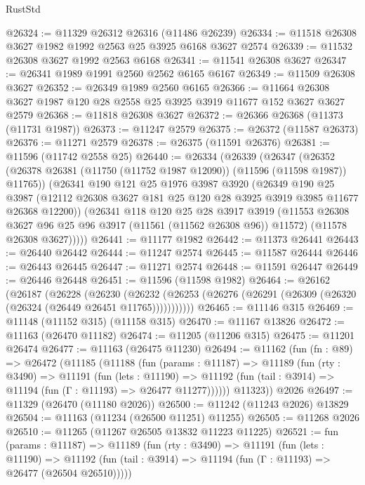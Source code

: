 \begin{lexlean}{RustStd}
\begin{coremodule}
@26324 := @11329 @26312 @26316 (@11486 @26239)
@26334 := @11518 @26308 @3627 @1982 @1992 @2563 @25 @3925 @6168 @3627 @2574
@26339 := @11532 @26308 @3627 @1992 @2563 @6168
@26341 := @11541 @26308 @3627
@26347 := @26341 @1989 @1991 @2560 @2562 @6165 @6167
@26349 := @11509 @26308 @3627
@26352 := @26349 @1989 @2560 @6165
@26366 := @11664 @26308 @3627 @1987 @120 @28 @2558 @25 @3925 @3919 @11677 @152 @3627 @3627 @2579
@26368 := @11818 @26308 @3627
@26372 := @26366 @26368 (@11373 (@11731 @1987))
@26373 := @11247 @2579
@26375 := @26372 (@11587 @26373)
@26376 := @11271 @2579
@26378 := @26375 (@11591 @26376)
@26381 := @11596 (@11742 @2558 @25)
@26440 := @26334
    (@26339
      (@26347
        (@26352 (@26378 @26381 (@11750 (@11752 @1987 @12090)) (@11596 (@11598 @1987)) @11765))
        (@26341
          @190
          @121
          @25
          @1976
          @3987
          @3920
          (@26349
            @190
            @25
            @3987
            (@12112 @26308 @3627 @181 @25 @120 @28 @3925 @3919 @3985 @11677 @26368 @12200))
          (@26341
            @118
            @120
            @25
            @28
            @3917
            @3919
            (@11553 @26308 @3627 @96 @25 @96 @3917 (@11561 (@11562 @26308 @96)) @11572)
            (@11578 @26308 @3627)))))
@26441 := @11177 @1982
@26442 := @11373 @26441
@26443 := @26440 @26442
@26444 := @11247 @2574
@26445 := @11587 @26444
@26446 := @26443 @26445
@26447 := @11271 @2574
@26448 := @11591 @26447
@26449 := @26446 @26448
@26451 := @11596 (@11598 @1982)
@26464 := @26162
    (@26187
      (@26228
        (@26230
          (@26232 (@26253 (@26276 (@26291 (@26309 (@26320 (@26324 (@26449 @26451 @11765)))))))))))
@26465 := @11146 @315
@26469 := @11148 (@11152 @315) (@11158 @315)
@26470 := @11167 @13826
@26472 := @11163 (@26470 @11182)
@26474 := @11205 (@11206 @315)
@26475 := @11201 @26474
@26477 := @11163 (@26475 @11230)
@26494 := @11162
    (fun (fn : @89) =>
    @26472
      (@11185
        (@11188
          (fun (params : @11187) =>
          @11189
            (fun (rty : @3490) =>
            @11191
              (fun (lets : @11190) =>
              @11192 (fun (tail : @3914) => @11194 (fun (Γ : @11193) => @26477 @11277))))))
        @11323))
    @2026
@26497 := @11329 (@26470 (@11180 @2026))
@26500 := @11242 (@11243 @2026) @13829
@26504 := @11163 (@11234 (@26500 @11251) @11255)
@26505 := @11268 @2026
@26510 := @11265 (@11267 @26505 @13832 @11223 @11225)
@26521 := fun (params : @11187) =>
  @11189
    (fun (rty : @3490) =>
    @11191
      (fun (lets : @11190) =>
      @11192 (fun (tail : @3914) => @11194 (fun (Γ : @11193) => @26477 (@26504 @26510)))))

\end{coremodule}
\end{lexlean}
